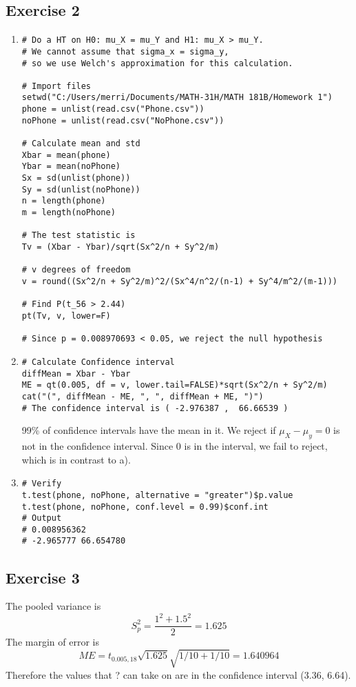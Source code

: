\documentclass{article}
\begin{document}
\subsection*{Exercise 2}
\begin{enumerate}
	\item 
\begin{lstlisting}
# Do a HT on H0: mu_X = mu_Y and H1: mu_X > mu_Y.
# We cannot assume that sigma_x = sigma_y,
# so we use Welch's approximation for this calculation.

# Import files
setwd("C:/Users/merri/Documents/MATH-31H/MATH 181B/Homework 1")
phone = unlist(read.csv("Phone.csv"))
noPhone = unlist(read.csv("NoPhone.csv"))

# Calculate mean and std
Xbar = mean(phone)
Ybar = mean(noPhone)
Sx = sd(unlist(phone))
Sy = sd(unlist(noPhone))
n = length(phone)
m = length(noPhone)

# The test statistic is 
Tv = (Xbar - Ybar)/sqrt(Sx^2/n + Sy^2/m)

# v degrees of freedom
v = round((Sx^2/n + Sy^2/m)^2/(Sx^4/n^2/(n-1) + Sy^4/m^2/(m-1)))

# Find P(t_56 > 2.44)
pt(Tv, v, lower=F)

# Since p = 0.008970693 < 0.05, we reject the null hypothesis
\end{lstlisting}

	\item 
\begin{lstlisting}
# Calculate Confidence interval
diffMean = Xbar - Ybar
ME = qt(0.005, df = v, lower.tail=FALSE)*sqrt(Sx^2/n + Sy^2/m)
cat("(", diffMean - ME, ", ", diffMean + ME, ")")
# The confidence interval is ( -2.976387 ,  66.66539 )
\end{lstlisting}
99\% of confidence intervals have the mean in it.
We reject if $\mu_X-\mu_y=0$ is not in the confidence interval.
Since 0 is in the interval, we fail to reject, which is in contrast to a).

	\item \begin{lstlisting}
# Verify
t.test(phone, noPhone, alternative = "greater")$p.value
t.test(phone, noPhone, conf.level = 0.99)$conf.int
# Output
# 0.008956362
# -2.965777 66.654780
	\end{lstlisting}
\end{enumerate}
\newpage 

\subsection*{Exercise 3}
The pooled variance is 
\[
	S_p^2 = \frac{1^2 + 1.5^2}{2} = 1.625
\]
The margin of error is 
\[
	ME = t_{0.005, 18}\sqrt{1.625}\sqrt{1/10 + 1/10}
	= 1.640964
\]
Therefore the values that ? can take on are in the confidence interval 
(3.36, 6.64).
\end{document}
